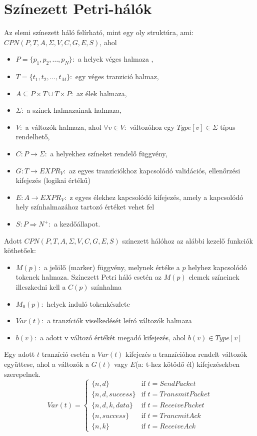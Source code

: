 \documentclass[12pt,a4paper]{book}
\begin{document}
\section{Színezett Petri-hálók}

Az elemi színezett háló felírható, mint egy oly struktúra, ami: $CPN(P,T,A,\Sigma ,V,C,G,E,S)$, ahol 
\begin{itemize}
\item $P=\{ p_1,p_2,\ldots ,p_N \}:$ a helyek véges halmaza ,
\item $T=\{ t_1,t_2,\ldots ,t_M\}:$ egy véges tranzició halmaz,
\item $A \subseteq P\times T \cup T\times P:$ az élek halmaza,
\item $\Sigma:$ a színek halmazainak halmaza, 
\item $V:$ a változók halmaza, ahol $\forall v\in V:$ változóhoz egy $Type[v] \in \Sigma $ típus rendelhető,
\item $C: P\rightarrow \Sigma :$ a helyekhez színeket rendelő függvény,
\item $G: T\rightarrow EXPR_V:$ az egyes tranzíciókhoz kapcsolódó validációs, ellenőrzési kifejezés (logikai értékű)
\item $E: A\rightarrow EXPR_V:$ z  egyes élekhez kapcsolódó kifejezés, amely a kapcsolódó hely színhalmazához tartozó értéket vehet fel
\item $S: P\Rightarrow N^+:$ a kezdőállapot.
\end{itemize}

Adott $CPN(P,T,A,\Sigma ,V,C,G,E,S)$ színezett hálóhoz az alábbi kezelő funkciók köthetőek: 
\begin{itemize}
\item $M(p):$ a jelölő (marker) függvény, melynek értéke a $p$ helyhez kapcsolódó tokenek halmaza. Színezett Petri háló esetén az $M(p)$ elemek színeinek illeszkedni kell a $C(p)$ színhalma
\item $M_0(p):$  helyek induló tokenkészlete
\item $Var(t):$ a tranzíciók viselkedését leíró változók halmaza
\item $b(v):$ a adott v változó értékét megadó kifejezés, ahol $b(v) \in Type[v]$
\end{itemize}

Egy adott $t$ tranzíció esetén a $Var(t)$ kifejezés a tranzícióhoz rendelt változók együttese, ahol a változók a $G(t)$ vagy $E$(a: t-hez kötődő él) kifejezésekben szerepelnek.
\begin{equation*}
Var(t)=\begin{cases}
\{n,d\} &\text{if } t=SendPacket\\
\{n,d,success\} &\text{if } t= TransmitPacket\\
\{n,d,k,data\} &\text{if } t=ReceivePacket\\
\{n,success\} &\text{if } t=TrancmitAck\\
\{n,k\} &\text{if }t=ReceiveAck
\end{cases}
\end{equation*}
\end{document}
